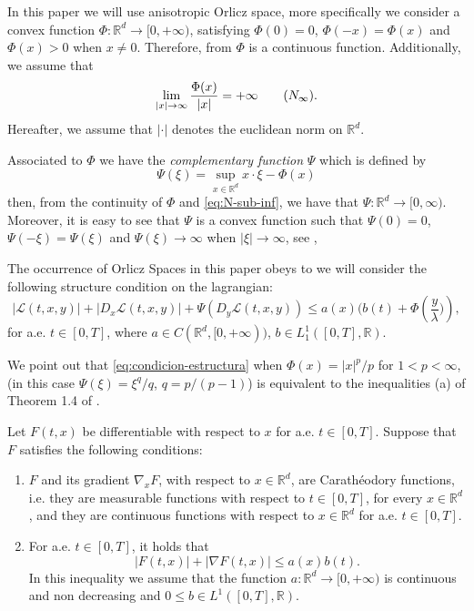 \documentclass[twoside]{article}
\makeatletter
\theoremstyle{remark}
\newcommand{\labitem}[2]{%
\def\@itemlabel{\textbf{#1}}
\item
\def\@currentlabel{#1}\label{#2}}
\newcommand{\rr}{\mathbb{R}}
\renewcommand{\leq}{\leqslant}
\makeatother
\begin{document}
In this paper we will use anisotropic Orlicz space, more specifically we consider a convex function 
$\Phi:\mathbb{R}^d\to [0,+\infty)$, satisfying $\Phi(0)=0$, $\Phi(-x)=\Phi(x)$ and 
 $\Phi(x)>0$ when $x\neq 0$. Therefore, from \cite[Cor. 2.35]{clarke2013functional} $\Phi$ is a continuous function. 
Additionally, we assume that
\begin{equation}\label{eq:N-sub-inf}
\lim_{|x|\to\infty}\frac{\Phi(x)}{|x|}=+\infty \tag{$N_{\infty}$}.
\end{equation}
Hereafter, we assume that $|\cdot|$ denotes the euclidean norm on $\rr^d$.

Associated to $\Phi$ we have the \emph{complementary function} $\Psi$ which is defined by 
\begin{equation}\label{eq:conjugada}
 \Psi(\xi)=\sup\limits_{x\in\mathbb{R}^d} x\cdot \xi-\Phi(x)
\end{equation}
then, from the continuity of $\Phi$ and  \eqref{eq:N-sub-inf}, we have that $\Psi:\rr^d \to [0,\infty)$. 
Moreover, it is easy to see that $\Psi$ is a convex function such that $\Psi(0)=0$, $\Psi(-\xi)=\Psi(\xi)$ and 
 $\Psi(\xi)\to \infty$  when $|\xi|\to \infty$,  see \cite[Section 4.2]{clarke2013functional},  \cite[Chapter 2]{mawhin2010critical}


The occurrence of Orlicz Spaces in this paper obeys to we will consider the 
following structure condition on the lagrangian:
\begin{equation}\label{eq:condicion-estructura}
|\mathcal{L}(t,x,y)|+ |D_{x}\mathcal{L}(t,x,y)|+\Psi(D_{y}\mathcal{L}(t,x,y))
\leq
a(x)(b(t)+ \Phi\left(\frac{y}{\lambda})\right), \tag{$S$}
\end{equation}
for a.e. $t\in [0,T]$,
where  $a\in C(\mathbb{R}^d,[0,+\infty))$, $b\in L^1_1([0,T],\rr) $.

We point out that \eqref{eq:condicion-estructura} when $\Phi(x)=|x|^p/p$ for $1<p<\infty$, 
(in this case $\Psi(\xi)=\xi^q/q$, $q=p/(p-1)$) is equivalent to the inequalities (a) of Theorem 1.4 of \cite{mawhin2010critical}.



Let $F(t,x)$ be differentiable with respect to $x$ for a.e. $t\in [0,T]$. Suppose that $F$ satisfies the following conditions:
\begin{enumerate}
\labitem{(C)}{item:condicion_c} $F$ and its gradient $\nabla_x F$, with respect to $x\in\rr^d$,  are  Carath\'eodory functions, i.e. they are measurable functions with respect to $t\in [0,T]$, for every  $x\in\rr^d$, and they are continuous functions with  respect to  $x\in\rr^d$ for a.e. $t \in [0,T]$.
 \labitem{(A)}{item:condicion_a}  For   a.e. $t\in [0,T]$, it holds that
\begin{equation}
|F(t,x)| + |\nabla F(t,x)|  \leq a(x)b(t).
\end{equation}
In this inequality we assume that the function  $a:\rr^d \to [0,+\infty)$ is continuous and non decreasing and $0\leq b\in L^1([0,T],\rr)$.
\end{enumerate}
\end{document}

